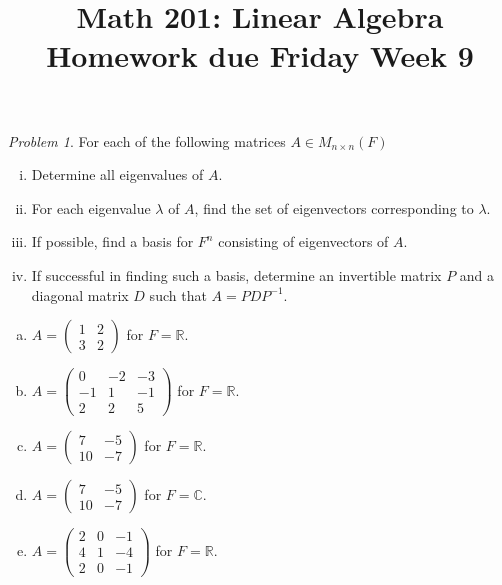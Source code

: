 \documentclass[11pt,twoside]{amsart}
\title{Math 201: Linear Algebra\\ Homework due Friday Week 9}
\theoremstyle{plain}
\theoremstyle{remark}
\newtheorem{prob}{Problem}
\theoremstyle{definition}
\theoremstyle{definition}
\newcommand{\R}{\mathbb{R}}
\newcommand{\C}{\mathbb{C}}
\begin{document}
\maketitle

\begin{prob}
For each of the following matrices $A\in M_{n\times n}(F)$
  \begin{enumerate}[(i)]
   \item Determine all eigenvalues of $A$.
   \item For each eigenvalue $\lambda$ of $A$, find the set of eigenvectors corresponding to $\lambda$.
   \item If possible, find a basis for $F^n$ consisting of eigenvectors of $A$.
   \item If successful in finding such a basis, determine an invertible matrix $P$ and a diagonal matrix $D$ such that $A=PDP^{-1}$.
  \end{enumerate}
  \begin{enumerate}[(a)]
   \item $A=\begin{pmatrix} 1 & 2 \\ 3 & 2\end{pmatrix}$ for $F = \R$.
   \item $A=\begin{pmatrix} 0 & -2 & -3\\ -1 & 1 & -1\\ 2 & 2 & 5\end{pmatrix}$ for $F = \R$.
   \item $A=\begin{pmatrix} 7 & -5\\ 10 & -7\end{pmatrix}$ for $F = \R$.
   \item $A=\begin{pmatrix} 7 & -5\\ 10 & -7\end{pmatrix}$ for $F = \C$.
   \item $A=\begin{pmatrix} 2 & 0 & -1\\ 4 & 1 & -4\\ 2& 0 & -1\end{pmatrix}$ for $F = \R$.
  \end{enumerate}
\end{prob}
\end{document}
